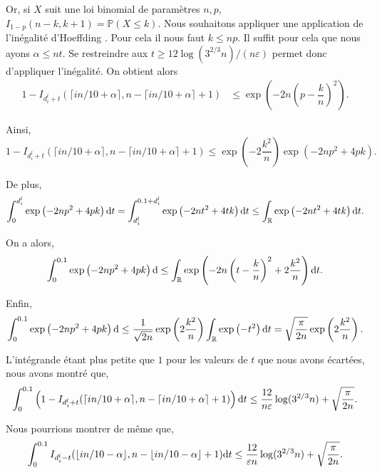 \newcommand{\kceil}{{k}}

Or, si \(X\) suit une loi binomial de paramètres \(n,p\), \(I_{1 - p}(n - k, k + 1)  = \mathbb P(X \leq k)\). Nous souhaitons appliquer une application de l'inégalité d'{\sc Hoeffding} \cite{10.5555/3134214}. Pour cela il nous faut \(\kceil \leq np\). Il suffit pour cela que nous ayons \(\alpha \leq nt\). Se restreindre aux \(t \geq 12\log(3^{2/3}n)/(n\varepsilon)\) permet donc d'appliquer l'inégalité. On obtient alors
\begin{align*}
    1 - I_{d_i^l + t}(\lceil in/10 + \alpha\rceil, n - \lceil in/10 + \alpha \rceil + 1) & \leq \exp\left( -2n\left( p - \dfrac{\kceil}{n} \right)^2 \right).
\end{align*}

Ainsi,
\[
    1 - I_{d_i^l + t}(\lceil in/10 + \alpha\rceil, n - \lceil in/10 + \alpha \rceil + 1) \leq \exp\left( - 2\dfrac{\kceil^2}{n} \right)\exp\left( -2np^2 + 4p\kceil \right).
\]

De plus,
\begin{align*}
    \int_0^{d_i^l}\exp\left( -2np^2 + 4p\kceil \right)\dt t = \int_{d_i^l}^{{0.1 + d_i^l}}\exp\left( -2nt^2 + 4t\kceil \right)\dt t \leq \int_{\R}\exp\left( -2nt^2 + 4t\kceil \right)\dt t.
\end{align*}

On a alors,
\[
    \int_0^{0.1}\exp\left( -2np^2 + 4p\kceil \right)\dt \leq  \int_{\R}\exp\left( -2n\left(t - \dfrac{\kceil}{n}\right)^2 + 2 \dfrac{\kceil^2}{n} \right)\dt t.
\]

Enfin,
\[
    \int_0^{0.1}\exp\left( -2np^2 + 4p\kceil \right)\dt \leq \dfrac{1}{\sqrt{2n}}\exp\left( 2 \dfrac{\kceil^2}{n} \right) \int_{\R}\exp\left( -t^2 \right)\dt t = \sqrt{\dfrac{\pi}{2n}}\exp\left( 2 \dfrac{\kceil^2}{n} \right).
\]

L'intégrande étant plus petite que \(1\) pour les valeurs de \(t\) que nous avons écartées, nous avons montré que,
\begin{align}
    \int_{0}^{0.1}\left( 1 - I_{d_i^l + t}(\lceil in/10 + \alpha\rceil, n - \lceil in/10 + \alpha \rceil + 1) \right) \mathrm{d} t \leq \dfrac{12}{n\varepsilon}\log(3^{2/3}n) + \sqrt{\dfrac{\pi}{2n}}.
\end{align}

Nous pourrions montrer de même que,
\begin{align}
    \int_{0}^{0.1}I_{d_i^l - t}(\lfloor in/10 - \alpha \rfloor , n - \lfloor in/10 - \alpha \rfloor + 1) \mathrm{d} t \leq \dfrac{12}{\varepsilon n}\log(3^{2/3}n) + \sqrt{\dfrac{\pi}{2n}}.
\end{align}

